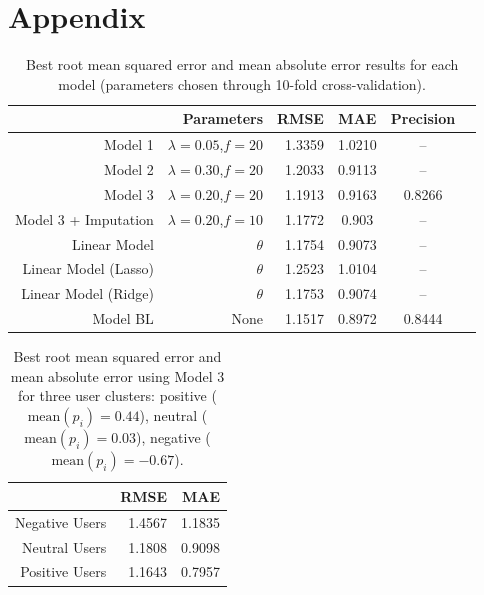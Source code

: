 \documentclass[12pt]{article}
\begin{document}
\newpage
\section*{Appendix}

\begin{table}[htbp]
  \centering
  \caption{Best root mean squared error and mean absolute error results for each model (parameters chosen through 10-fold cross-validation).}
    \begin{tabular}{rrrccc}
    \toprule
          & Parameters & RMSE  & MAE & Precision \\
    \midrule
    Model 1 & $\lambda=0.05$,$f=20$ & 1.3359 & 1.0210 & -- \\
    Model 2 & $\lambda=0.30$,$f=20$ & 1.2033 & 0.9113 & --\\
    Model 3 & $\lambda=0.20$,$f=20$ & 1.1913 & 0.9163 & 0.8266\\
    Model 3 + Imputation & $\lambda=0.20$,$f=10$ & 1.1772 & 0.903  & --\\
    Linear Model & $\theta$ & 1.1754 & 0.9073 & --\\
    Linear Model (Lasso) & $\theta$ & 1.2523 & 1.0104 & -- \\
    Linear Model (Ridge) & $\theta$ & 1.1753 & 0.9074 & --\\
    Model BL & None & 1.1517 & 0.8972 & 0.8444 \\
    \bottomrule
    \end{tabular}%
  \label{tab:results}%
\end{table}%

\begin{table}[htbp]
  \centering
  \caption{Best root mean squared error and mean absolute error using Model 3 for three user clusters: positive ($\text{mean}(p_i)=0.44$), neutral ($\text{mean}(p_i)=0.03$), negative ($\text{mean}(p_i)=-0.67$).}
    \begin{tabular}{rrr}
    \toprule
          & RMSE  & MAE \\
    \midrule
    Negative Users & 1.4567 & 1.1835 \\
    Neutral Users & 1.1808 & 0.9098 \\
    Positive Users & 1.1643 & 0.7957 \\
    \bottomrule
    \end{tabular}%
  \label{tab:results_clusters}%
\end{table}%
\end{document}
